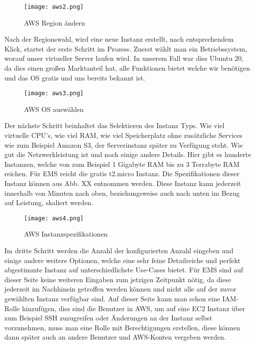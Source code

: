 \begin{center}
\begin{figure}[h]
    \centering
    \texttt{[image: aws2.png]}
    \caption{AWS Region ändern}
\end{figure}
\end{center}

Nach der Regionswahl, wird eine neue Instanz erstellt, nach entsprechendem Klick, startet der erste Schritt im Prozess. Zuerst wählt man ein Betriebssystem, worauf unser virtueller Server laufen wird. In unserem Fall war dies Ubuntu 20, da dies einen großen Marktanteil hat, alle Funktionen bietet welche wir benötigen und das OS gratis und uns bereits bekannt ist.

\begin{center}
\begin{figure}[h]
    \centering
    \texttt{[image: aws3.png]}
    \caption{AWS OS auswählen}
\end{figure}
\end{center}

Der nächste Schritt beinhaltet das Selektieren des Instanz Typs. Wie viel virtuelle CPU's, wie viel RAM, wie viel Speicherplatz ohne zusätzliche Services wie zum Beispiel Amazon S3, der Serverinstanz später zu Verfügung steht. Wie gut die Netzwerkleistung ist und noch einige andere Details. Hier gibt es hunderte Instanzen, welche von zum Beispiel 1 Gigabyte RAM bis zu 3 Terrabyte RAM reichen. Für EMS reicht die gratis t2.micro Instanz. Die Spezifikationen dieser Instanz können aus Abb. XX entnommen werden. Diese Instanz kann jederzeit innerhalb von Minuten nach oben, beziehungsweise auch nach unten im Bezug auf Leistung, skaliert werden.

\begin{center}
\begin{figure}[h]
    \centering
    \texttt{[image: aws4.png]}
    \caption{AWS Instanzspezifikationen}
\end{figure}
\end{center}

Im dritte Schritt werden die Anzahl der konfigurierten Anzahl eingeben und einige andere weitere Optionen, welche eine sehr feine Detailreiche und perfekt abgestimmte Instanz auf unterschiedlichste Use-Cases bietet. Für EMS sind auf dieser Seite keine weiteren Eingaben zum jetzigen Zeitpunkt nötig, da diese jederzeit im Nachhinein getroffen werden können und nicht alle auf der zuvor gewählten Instanz verfügbar sind. Auf dieser Seite kann man schon eine IAM-Rolle hinzufügen, dies sind die Benutzer in AWS, um auf eine EC2 Instanz über zum Beispiel SSH zuzugreifen oder Änderungen an der Instanz selbst vorzunehmen, muss man eine Rolle mit Berechtigungen erstellen, diese können dann später auch an andere Benutzer und AWS-Konten vergeben werden.

